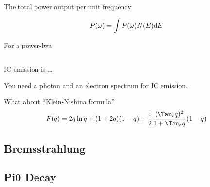 The total power output per unit frequency 

\begin{equation}
  P(\omega) = \int P(\omega) N(E) \text{d}E 
\end{equation}

For a power-lwa 

\subsection{}


\Gls{IC} emission is \ldots

You need a photon and an electron spectrum for \ac{IC} emission.

What about ``Klein-Nishina formula''
\begin{equation}
  F(q) = 2q \ln q + (1+2q)(1-q) 
  + \frac{1}{2} \frac{(\Tau_e q)^2}{1+\Tau_e q} (1-q)
\end{equation}


\subsection{Bremsstrahlung}


\subsection{Pi0 Decay}



